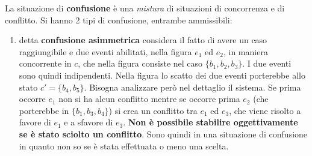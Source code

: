 \documentclass[a4paper,12pt, oneside]{book}
\begin{document}
\begin{definizione}
  La situazione di \textbf{confusione} è una \textit{mistura} di situazioni di
  concorrenza e di conflitto. Si hanno 2 tipi di confusione, entrambe
  ammissibili: 
  \begin{enumerate}
    \item detta \textbf{confusione asimmetrica} considera il fatto di avere un
    caso raggiungibile e due eventi abilitati, nella figura $e_1$ ed $e_2$, in
    maniera concorrente in $c$, che nella figura consiste nel caso
    $\{b_1,b_2,b_3\}$. I due eventi sono quindi indipendenti. Nella figura lo
    scatto dei due eventi porterebbe allo stato $c'=\{b_4,b_5\}$. Bisogna
    analizzare però nel dettaglio il sistema. Se prima occorre $e_1$ non si ha
    alcun conflitto mentre se occorre prima $e_2$ (che porterebbe in
    $\{b_1,b_3,b_4\}$) si crea un conflitto tra $e_1$ ed $e_3$, che viene
    risolto a favore di $e_1$ e a sfavore di $e_3$. \textbf{Non è possibile
      stabilire oggettivamente se è stato sciolto un conflitto}. Sono quindi in
    una situazione di confusione in quanto non so se è stata effettuata o meno
    una scelta.
    \begin{figure}[H]
      \centering
\end{figure}
\end{enumerate}
\end{definizione}
\end{document}
